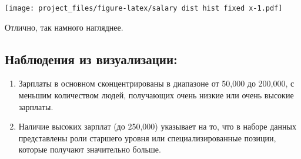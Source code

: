 \documentclass[
]{article}
\newenvironment{Shaded}{\begin{snugshade}}{\end{snugshade}}
\newcommand{\AttributeTok}[1]{\textcolor[rgb]{0.13,0.29,0.53}{#1}}
\newcommand{\CommentTok}[1]{\textcolor[rgb]{0.56,0.35,0.01}{\textit{#1}}}
\newcommand{\ConstantTok}[1]{\textcolor[rgb]{0.56,0.35,0.01}{#1}}
\newcommand{\DecValTok}[1]{\textcolor[rgb]{0.00,0.00,0.81}{#1}}
\newcommand{\FunctionTok}[1]{\textcolor[rgb]{0.13,0.29,0.53}{\textbf{#1}}}
\newcommand{\NormalTok}[1]{#1}
\newcommand{\SpecialCharTok}[1]{\textcolor[rgb]{0.81,0.36,0.00}{\textbf{#1}}}
\newcommand{\StringTok}[1]{\textcolor[rgb]{0.31,0.60,0.02}{#1}}
\providecommand{\tightlist}{%
  \setlength{\itemsep}{0pt}\setlength{\parskip}{0pt}}
\begin{document}
\begin{Shaded}
\end{Shaded}

\texttt{[image: project\_files/figure-latex/salary dist hist fixed x-1.pdf]}

Отлично, так намного нагляднее.

\subsection{Наблюдения из
визуализации:}\label{ux43dux430ux431ux43bux44eux434ux435ux43dux438ux44f-ux438ux437-ux432ux438ux437ux443ux430ux43bux438ux437ux430ux446ux438ux438}

\begin{enumerate}
\def\labelenumi{\arabic{enumi}.}
\tightlist
\item
  Зарплаты в основном сконцентрированы в диапазоне от 50,000 до 200,000,
  с меньшим количеством людей, получающих очень низкие или очень высокие
  зарплаты.
\item
  Наличие высоких зарплат (до 250,000) указывает на то, что в наборе
  данных представлены роли старшего уровня или специализированные
  позиции, которые получают значительно больше.
\end{enumerate}
\end{document}
